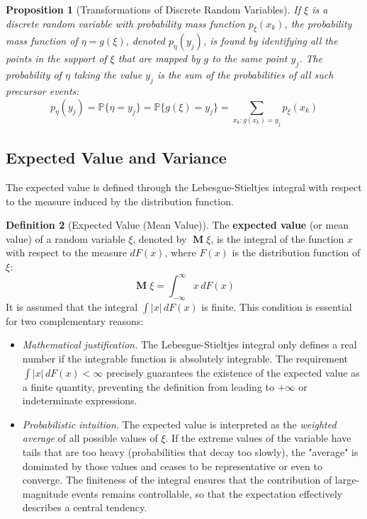 \documentclass[12pt, openany]{book}
\theoremstyle{definition}
\newtheorem{definition}{Definition}[section]
\theoremstyle{plain}
\newtheorem{proposition}[definition]{Proposition}
\theoremstyle{remark}
\newcommand{\probP}{\mathbb{P}}
\DeclareMathOperator{\E}{\mathbf{M}} %
\begin{document}
\begin{proposition}[Transformations of Discrete Random Variables]
If $\xi$ is a discrete random variable with probability mass function $p_\xi(x_k)$, the probability mass function of $\eta=g(\xi)$, denoted $p_\eta(y_j)$, is found by identifying all the points in the support of $\xi$ that are mapped by $g$ to the same point $y_j$. The probability of $\eta$ taking the value $y_j$ is the sum of the probabilities of all such precursor events:
$$ p_\eta(y_j) = \probP\{\eta = y_j\} = \probP\{g(\xi) = y_j\} = \sum_{x_k : g(x_k)=y_j} p_\xi(x_k) $$
\end{proposition}

\subsection{Expected Value and Variance}
The expected value is defined through the Lebesgue-Stieltjes integral with respect to the measure induced by the distribution function.

\begin{definition}[Expected Value (Mean Value)]
The \textbf{expected value} (or mean value) of a random variable $\xi$, denoted by $\E\xi$, is the integral of the function $x$ with respect to the measure $dF(x)$, where $F(x)$ is the distribution function of $\xi$:
$$ \E\xi = \int_{-\infty}^{\infty} x \,dF(x) $$
It is assumed that the integral $\int |x|\, dF(x)$ is finite. This condition is essential for two complementary reasons:

\begin{itemize}
  \item \emph{Mathematical justification.} The Lebesgue-Stieltjes integral only defines a real number if the integrable function is absolutely integrable. The requirement $\int |x|\,dF(x) < \infty$ precisely guarantees the existence of the expected value as a finite quantity, preventing the definition from leading to $+\infty$ or indeterminate expressions.
  \item \emph{Probabilistic intuition.} The expected value is interpreted as the \emph{weighted average} of all possible values of $\xi$. If the extreme values of the variable have tails that are too heavy (probabilities that decay too slowly), the "average" is dominated by those values and ceases to be representative or even to converge. The finiteness of the integral ensures that the contribution of large-magnitude events remains controllable, so that the expectation effectively describes a central tendency.
\end{itemize}
\end{definition}
\end{document}
